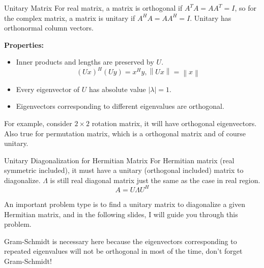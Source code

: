 \documentclass{beamer}
\begin{document}
\begin{frame}{Unitary Matrix}
For real matrix, a matrix is orthogonal if $A^TA=AA^T=I$, so for the complex matrix, a matrix is unitary if $A^HA=AA^H=I$. Unitary has orthonormal column vectors.

\vspace{5pt}
\textbf{Properties:}
\begin{itemize}
    \item Inner products and lengths are preserved by $U$.
    \begin{equation*}
        \left( Ux \right) ^H\left( Uy \right) =x^Hy, \left\| Ux \right\| =\left\| x \right\|
    \end{equation*}
    \item Every eigenvector of $U$ has absolute value $|\lambda| = 1$.
    \item Eigenvectors corresponding to different eigenvalues are orthogonal.
\end{itemize}

\vspace{3pt}
For example, consider $2\times 2$ rotation matrix, it will have orthogonal eigenvectors. Also true for permutation matrix, which is a orthogonal matrix and of course unitary.

\end{frame}

\begin{frame}{Unitary Diagonalization for Hermitian Matrix}
For Hermitian matrix (real symmetric included), it must have a unitary (orthogonal included) matrix to diagonalize. $\Lambda$ is still real diagonal matrix just the same as the case in real region.
\begin{equation*}
    A=U\Lambda U^H
\end{equation*}

An important problem type is to find a unitary matrix to diagonalize a given Hermitian matrix, and in the following slides, I will guide you through this problem.

\vspace{3pt}
Gram-Schmidt is necessary here because the eigenvectors corresponding to repeated eigenvalues will not be orthogonal in most of the time, don't forget Gram-Schmidt!

\end{frame}
\end{document}
